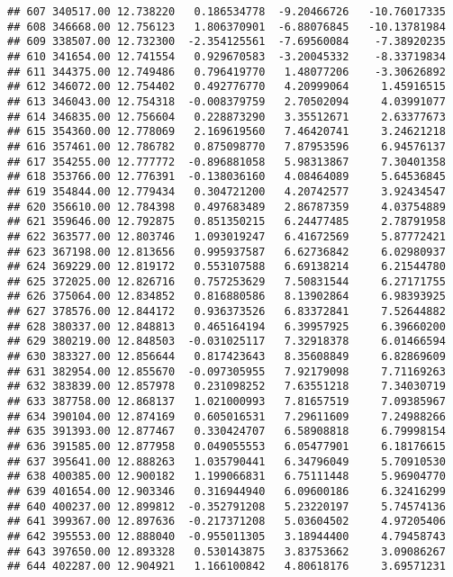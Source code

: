 \documentclass[
]{article}
\begin{document}
\begin{verbatim}
## 607 340517.00 12.738220   0.186534778  -9.20466726   -10.76017335
## 608 346668.00 12.756123   1.806370901  -6.88076845   -10.13781984
## 609 338507.00 12.732300  -2.354125561  -7.69560084    -7.38920235
## 610 341654.00 12.741554   0.929670583  -3.20045332    -8.33719834
## 611 344375.00 12.749486   0.796419770   1.48077206    -3.30626892
## 612 346072.00 12.754402   0.492776770   4.20999064     1.45916515
## 613 346043.00 12.754318  -0.008379759   2.70502094     4.03991077
## 614 346835.00 12.756604   0.228873290   3.35512671     2.63377673
## 615 354360.00 12.778069   2.169619560   7.46420741     3.24621218
## 616 357461.00 12.786782   0.875098770   7.87953596     6.94576137
## 617 354255.00 12.777772  -0.896881058   5.98313867     7.30401358
## 618 353766.00 12.776391  -0.138036160   4.08464089     5.64536845
## 619 354844.00 12.779434   0.304721200   4.20742577     3.92434547
## 620 356610.00 12.784398   0.497683489   2.86787359     4.03754889
## 621 359646.00 12.792875   0.851350215   6.24477485     2.78791958
## 622 363577.00 12.803746   1.093019247   6.41672569     5.87772421
## 623 367198.00 12.813656   0.995937587   6.62736842     6.02980937
## 624 369229.00 12.819172   0.553107588   6.69138214     6.21544780
## 625 372025.00 12.826716   0.757253629   7.50831544     6.27171755
## 626 375064.00 12.834852   0.816880586   8.13902864     6.98393925
## 627 378576.00 12.844172   0.936373526   6.83372841     7.52644882
## 628 380337.00 12.848813   0.465164194   6.39957925     6.39660200
## 629 380219.00 12.848503  -0.031025117   7.32918378     6.01466594
## 630 383327.00 12.856644   0.817423643   8.35608849     6.82869609
## 631 382954.00 12.855670  -0.097305955   7.92179098     7.71169263
## 632 383839.00 12.857978   0.231098252   7.63551218     7.34030719
## 633 387758.00 12.868137   1.021000993   7.81657519     7.09385967
## 634 390104.00 12.874169   0.605016531   7.29611609     7.24988266
## 635 391393.00 12.877467   0.330424707   6.58908818     6.79998154
## 636 391585.00 12.877958   0.049055553   6.05477901     6.18176615
## 637 395641.00 12.888263   1.035790441   6.34796049     5.70910530
## 638 400385.00 12.900182   1.199066831   6.75111448     5.96904770
## 639 401654.00 12.903346   0.316944940   6.09600186     6.32416299
## 640 400237.00 12.899812  -0.352791208   5.23220197     5.74574136
## 641 399367.00 12.897636  -0.217371208   5.03604502     4.97205406
## 642 395553.00 12.888040  -0.955011305   3.18944400     4.79458743
## 643 397650.00 12.893328   0.530143875   3.83753662     3.09086267
## 644 402287.00 12.904921   1.166100842   4.80618176     3.69571231

\end{verbatim}
\end{document}
